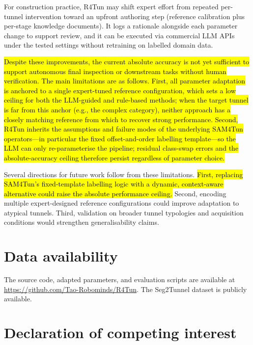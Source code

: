 \documentclass[a4paper,fleqn]{cas-dc}
\begin{document}
{For construction practice, R4Tun may shift expert effort from repeated per-tunnel intervention toward an upfront authoring step (reference calibration plus per-stage knowledge documents). It logs a rationale alongside each parameter change to support review, and it can be executed via commercial LLM APIs under the tested settings without retraining on labelled domain data.

\hl{Despite these improvements, the current absolute accuracy is not yet sufficient to support autonomous final inspection or downstream tasks without human verification. The main limitations are as follows. First, all parameter adaptation is anchored to a single expert-tuned reference configuration, which sets a low ceiling for both the LLM-guided and rule-based methods; when the target tunnel is far from this anchor (e.g., the complex category), neither approach has a closely matching reference from which to recover strong performance. Second, R4Tun inherits the assumptions and failure modes of the underlying SAM4Tun operators---in particular the fixed offset-and-order labelling template---so the LLM can only re-parameterise the pipeline; residual class-swap errors and the absolute-accuracy ceiling therefore persist regardless of parameter choice.}

Several directions for future work follow from these limitations. \hl{First, replacing SAM4Tun's fixed-template labelling logic with a dynamic, context-aware alternative could raise the absolute performance ceiling.} Second, encoding multiple expert-designed reference configurations could improve adaptation to atypical tunnels. Third, validation on broader tunnel typologies and acquisition conditions would strengthen generalisability claims.


\section*{Data availability}

The source code, adapted parameters, and evaluation scripts are available at \url{https://github.com/Tao-Robominds/R4Tun}. The Seg2Tunnel dataset is publicly available.

\section*{Declaration of competing interest}

}
\end{document}
